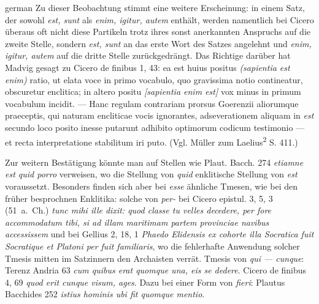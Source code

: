 \begin{otherlanguage*}{german}
Zu dieser Beobachtung stimmt eine weitere Erscheinung: in einem Satz, der sowohl \emph{est, sunt} als \emph{enim, igitur, autem} enthält, werden namentlich bei Cicero überaus oft nicht diese Partikeln trotz ihres sonst anerkannten Anspruchs auf die zweite Stelle, sondern \emph{est, sunt} an das erste Wort des Satzes angelehnt und \emph{enim, igitur, autem} auf die dritte Stelle zurückgedrängt. Das Richtige darüber hat Madvig gesagt zu Cicero de finibus 1, 43: ea est huius positus \emph{(sapientia est enim)} ratio, ut elata voce in primo vocabulo, quo gravissima notio contineatur, obscuretur enclitica; in altero positu \emph{[sapientia enim est]} vox minus in primum vocabulum incidit. — Hanc regulam contrariam prorsus Goerenzii aliorumque praeceptis, qui naturam encliticae vocis ignorantes, adseverationem aliquam in \emph{est} secundo loco posito inesse putarunt adhibito optimorum codicum testimonio — et recta interpretatione stabilitum iri puto. (Vgl. Müller zum Laelius\textsuperscript{2} S. 411.)

Zur weitern Bestätigung könnte man auf Stellen wie Plaut. Bacch. 274 \emph{etiamne est quid porro} verweisen, wo die Stellung von \emph{quid} enklitische Stellung von \emph{est} voraussetzt. Besonders finden sich aber bei \emph{esse} ähnliche Tmesen, wie bei den früher besprochnen Enklitika: solche von \emph{per-} bei Cicero epistul. 3, 5, 3 (51~a.~Ch.) \emph{tunc mihi ille dixit: quod classe tu velles decedere, per fore accommodatum tibi, si ad illam maritimam partem provinciae navibus accessissem} und bei Gellius 2, 18, 1 \emph{Phaedo Elidensis ex cohorte illa Socratica fuit Socratique et Platoni per fuit familiaris}, wo die fehlerhafte Anwendung solcher Tmesis mitten im Satzinnern den Archaisten verrät. Tmesis von \emph{qui — cunque}: Terenz Andria 63 \emph{cum quibus erat quomque una, eis se dedere}. Cicero de finibus 4, 69 \emph{quod erit cunque visum, ages}. Dazu bei einer Form von \emph{fieri}: Plautus Bacchides 252 \emph{istius hominis ubi fit quomque mentio}.


\end{otherlanguage*}
